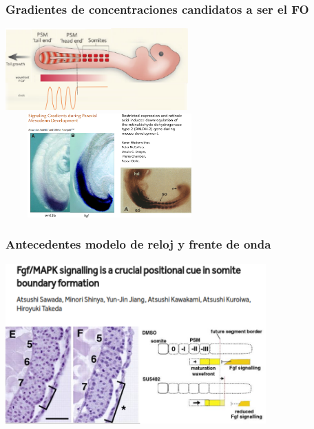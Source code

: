 \documentclass[xcolor=table, xllnames]{beamer}
\begin{document}
\begin{frame}
	\frametitle{Gradientes de concentraciones candidatos a ser el FO}
	\centering
	\includegraphics[width=7cm]{Figuras/FOinv.png} \\
	\vspace{.3cm}
	\includegraphics[width=8cm,height=4cm]{Figuras/antecedentesFO4.png} \\[.cm]

\end{frame}

\begin{frame}
	\frametitle{Antecedentes modelo de reloj y frente de onda}
	\centering
	\includegraphics[width=10cm]{Figuras/antecedentesFO5.png}
	
\end{frame}
\end{document}
